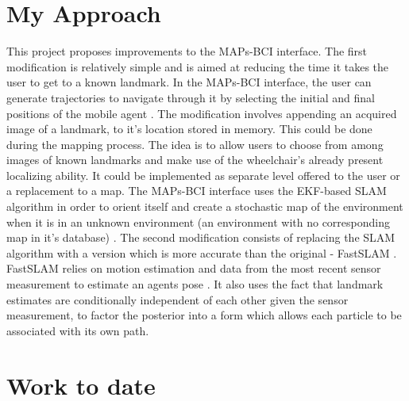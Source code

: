 \documentclass{article}
\begin{document}
\section{My Approach}

This project proposes improvements to the MAPs-BCI interface.  The first modification is relatively simple and is aimed at reducing the time it takes the user to get to a known landmark.  In the MAPs-BCI interface, the user can generate trajectories to navigate through it by selecting the initial and final positions of the mobile agent \cite{cheen_maps_2007}.  The modification involves appending an acquired image of a landmark, to it's location stored in memory.  This could be done during the mapping process.  The idea is to allow users to choose from among images of known landmarks and make use of the wheelchair's already present localizing ability.   It could be implemented as separate level offered to the user or a replacement to a map.
The MAPs-BCI interface uses the EKF-based SLAM algorithm in order to orient itself and create a stochastic map of the environment when it is in an unknown environment (an environment with no corresponding map in it's database) \cite{cheen_maps_2007}.  The second modification consists of replacing the SLAM algorithm with a version which is more accurate than the original - FastSLAM \cite{montemerlo_fastslam_2003}.  FastSLAM relies on motion estimation and data from the most recent sensor measurement to estimate an agents pose \cite{montemerlo_fastslam_2003}.  It also uses the fact that landmark estimates are conditionally independent of each other given the sensor measurement, to factor the posterior into a form which allows each particle to be associated with its own path.  

\section{Work to date}
\end{document}
